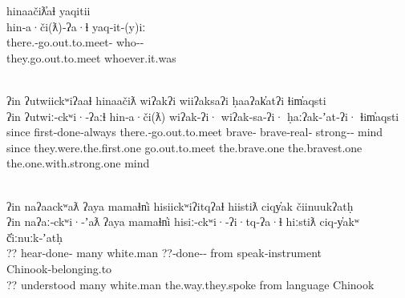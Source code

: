 \glllll hinaačiƛ̓aɬ                            yaqitii\\
        hin‑a·či(ƛ)‑ʔa·ɬ                      yaq‑it‑(y)iː\\
        there.‑go.out.to.meet‑ who‑‑\\
        they.go.out.to.meet                   whoever.it.was\\
                                     \\
        \vfix

\glllll ʔin   ʔutwiickʷiʔaaɬ          hinaačiƛ                      wiʔakʔi        wiiʔaksaʔi           ḥaaʔak̓atʔi                ɬim̓aqsti\\
        ʔin   ʔutwiː‑ckʷi·‑ʔaːɬ       hin‑a·či(ƛ)                   wiʔak‑ʔi·      wiʔak‑sa‑ʔi·         ḥaːʔak‑ʼat‑ʔi·            ɬim̓aqsti\\
        since first‑done‑always       there.‑go.out.to.meet brave‑ brave‑real‑  strong‑‑ mind\\
        since they.were.the.first.one go.out.to.meet                the.brave.one  the.bravest.one      the.one.with.strong.one   mind\\
        { }                                                                             \\
        \vfix

\glllll ʔin naʔaackʷaƛ         ʔaya     mamaɬn̓i   hisiickʷiʔitqʔaɬ           hiistiƛ   ciqy̓ak           čiinuukʔatḥ\\
        ʔin naʔaː‑ckʷi·‑ʼaƛ    ʔaya     mamaɬn̓i   hisiː‑ckʷi·‑ʔi·tq‑ʔa·ɬ     hiːstiƛ   ciq‑y̓akʷ         č̓iːnuːk‑ʼatḥ\\
        ??  hear‑done‑ many     white.man ??‑done‑‑ from      speak‑instrument Chinook‑belonging.to\\
        ??  understood         many     white.man the.way.they.spoke         from      language         Chinook\\
        { }                                           \\
        \vfix

